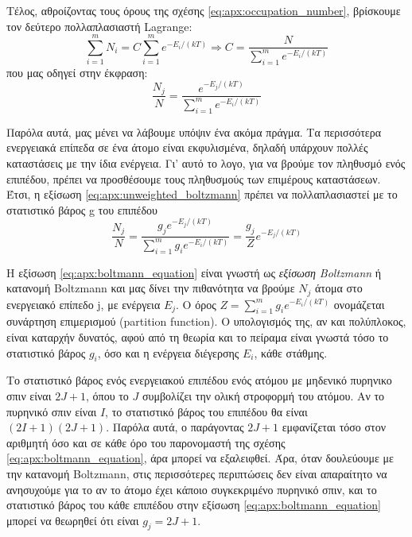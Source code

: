 Τέλος, αθροίζοντας τους όρους της σχέσης \eqref{eq:apx:occupation_number}, βρίσκουμε τον δεύτερο πολλαπλασιαστή Lagrange:
\begin{equation}
    \label{eq:apx:lambda_value}
    \sum_{i=1}^{m} N_i = C \sum_{i=1}^{m} e^{-E_i/(kT)} \Rightarrow C = \frac{N}{\sum_{i=1}^{m} e^{-E_i/(kT)}}
\end{equation}
που μας οδηγεί στην έκφραση:
\begin{equation}
    \label{eq:apx:unweighted_boltzmann}
    \frac{N_j}{N} = \frac{e^{-E_j/(kT)}}{\sum_{i=1}^{m}e^{-E_i/(kT)}}
\end{equation}

Παρόλα αυτά, μας μένει να λάβουμε υπόψιν ένα ακόμα πράγμα. Τα περισσότερα ενεργειακά επίπεδα σε ένα άτομο είναι εκφυλισμένα, δηλαδή υπάρχουν πολλές καταστάσεις με την ίδια ενέργεια. Γι' αυτό το λογο, για να βρούμε τον πληθυσμό ενός επιπέδου, πρέπει να προσθέσουμε τους πληθυσμούς των επιμέρους καταστάσεων. Έτσι, η εξίσωση \eqref{eq:apx:unweighted_boltzmann} πρέπει να πολλαπλασιαστεί με το στατιστικό βάρος g του επιπέδου
\begin{equation}
    \label{eq:apx:boltmann_equation}
   \boxed{ \frac{N_j}{N} = \frac{g_j e^{-E_j/(kT)}}{\sum_{i=1}^{m} g_i e^{-E_i/(kT)}} = \frac{g_j}{Z}e^{-E_j/(kT)}}
\end{equation}

Η εξίσωση \eqref{eq:apx:boltmann_equation} είναι γνωστή ως \textit{εξίσωση Boltzmann} ή κατανομή Boltzmann και μας δίνει την πιθανότητα να βρούμε $N_j$ άτομα στο ενεργειακό επίπεδο j, με ενέργεια $E_j$. Ο όρος $Z = \sum_{i=1}^{m} g_i e^{-E_i/(kT)}$ ονομάζεται συνάρτηση επιμερισμού (partition function). Ο υπολογισμός της, αν και πολύπλοκος, είναι καταρχήν δυνατός, αφού από τη θεωρία και το πείραμα είναι γνωστά τόσο το στατιστικό βάρος $g_i$, όσο και η ενέργεια διέγερσης $E_i$, κάθε στάθμης.

Το στατιστικό βάρος ενός ενεργειακού επιπέδου ενός ατόμου με μηδενικό πυρηνικο σπιν είναι $2J+1$, όπου το $J$ συμβολίζει την ολική στροφορμή του ατόμου. Αν το πυρηνικό σπιν είναι $I$, το στατιστικό βάρος του επιπέδου θα είναι $(2I+1)(2J+1)$. Παρόλα αυτά, ο παράγοντας $2J+1$ εμφανίζεται τόσο στον αριθμητή όσο και σε κάθε όρο του παρονομαστή της σχέσης \eqref{eq:apx:boltmann_equation}, άρα μπορεί να εξαλειφθεί. Άρα, όταν δουλεύουμε με την κατανομή Boltzmann, στις περισσότερες περιπτώσεις δεν είναι απαραίτητο να ανησυχούμε για το αν το άτομο έχει κάποιο συγκεκριμένο πυρηνικό σπιν, και το στατιστικό βάρος του κάθε επιπέδου στην εξίσωση \eqref{eq:apx:boltmann_equation} μπορεί να θεωρηθεί ότι είναι $g_j = 2J+1$.


